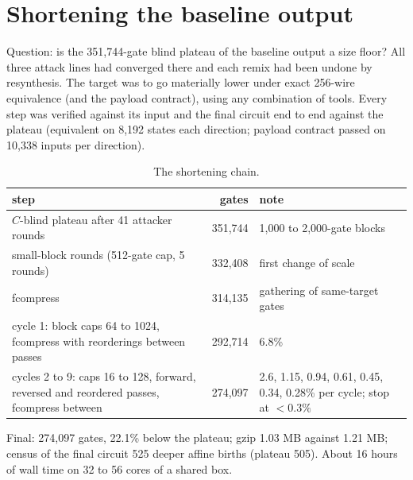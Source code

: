 \documentclass[11pt,a4paper]{article}
\begin{document}
\section{Shortening the baseline output}
Question: is the 351{,}744-gate blind plateau of the baseline output a size floor? All three attack lines had converged there and each remix had been undone by resynthesis. The target was to go materially lower under exact 256-wire equivalence (and the payload contract), using any combination of tools. Every step was verified against its input and the final circuit end to end against the plateau (equivalent on 8{,}192 states each direction; payload contract passed on 10{,}338 inputs per direction).
\begin{table}[H]\centering\small
\begin{tabular}{p{7.6cm}rp{6cm}}
\toprule
step & gates & note \\
\midrule
$C$-blind plateau after 41 attacker rounds & 351,744 & 1,000 to 2,000-gate blocks \\
small-block rounds (512-gate cap, 5 rounds) & 332,408 & first change of scale \\
fcompress & 314,135 & gathering of same-target gates \\
cycle 1: block caps 64 to 1024, fcompress with reorderings between passes & 292,714 & 6.8\% \\
cycles 2 to 9: caps 16 to 128, forward, reversed and reordered passes, fcompress between & 274,097 & 2.6, 1.15, 0.94, 0.61, 0.45, 0.34, 0.28\% per cycle; stop at $<0.3\%$ \\
\bottomrule
\end{tabular}
\caption{The shortening chain.}
\end{table}
Final: 274{,}097 gates, 22.1\% below the plateau; gzip 1.03 MB against 1.21 MB; census of the final circuit 525 deeper affine births (plateau 505). About 16 hours of wall time on 32 to 56 cores of a shared box.
\end{document}

